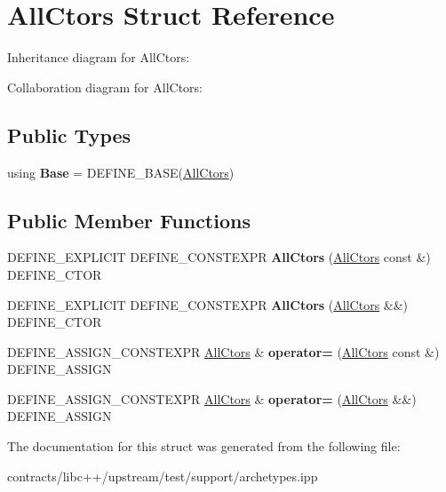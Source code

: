 \hypertarget{struct_all_ctors}{}\section{All\+Ctors Struct Reference}
\label{struct_all_ctors}


Inheritance diagram for All\+Ctors\+:


Collaboration diagram for All\+Ctors\+:
\subsection*{Public Types}
\begin{DoxyCompactItemize}
\item 
\mbox{\label{struct_all_ctors_a1f90e004351c076d9336a1df55b2a695}} 
using {\bfseries Base} = D\+E\+F\+I\+N\+E\+\_\+\+B\+A\+SE(\mbox{\hyperlink{struct_all_ctors}{All\+Ctors}})
\end{DoxyCompactItemize}
\subsection*{Public Member Functions}
\begin{DoxyCompactItemize}
\item 
\mbox{\label{struct_all_ctors_a0bb57fbc8ba8fcf689d6c3683961db70}} 
D\+E\+F\+I\+N\+E\+\_\+\+E\+X\+P\+L\+I\+C\+IT D\+E\+F\+I\+N\+E\+\_\+\+C\+O\+N\+S\+T\+E\+X\+PR {\bfseries All\+Ctors} (\mbox{\hyperlink{struct_all_ctors}{All\+Ctors}} const \&) D\+E\+F\+I\+N\+E\+\_\+\+C\+T\+OR
\item 
\mbox{\label{struct_all_ctors_a5c0d184f7fd6a13b7a297a274ff8992a}} 
D\+E\+F\+I\+N\+E\+\_\+\+E\+X\+P\+L\+I\+C\+IT D\+E\+F\+I\+N\+E\+\_\+\+C\+O\+N\+S\+T\+E\+X\+PR {\bfseries All\+Ctors} (\mbox{\hyperlink{struct_all_ctors}{All\+Ctors}} \&\&) D\+E\+F\+I\+N\+E\+\_\+\+C\+T\+OR
\item 
\mbox{\label{struct_all_ctors_adfeaa164a315d5b2420d9bfd593ce99e}} 
D\+E\+F\+I\+N\+E\+\_\+\+A\+S\+S\+I\+G\+N\+\_\+\+C\+O\+N\+S\+T\+E\+X\+PR \mbox{\hyperlink{struct_all_ctors}{All\+Ctors}} \& {\bfseries operator=} (\mbox{\hyperlink{struct_all_ctors}{All\+Ctors}} const \&) D\+E\+F\+I\+N\+E\+\_\+\+A\+S\+S\+I\+GN
\item 
\mbox{\label{struct_all_ctors_a1a5b6ea1c0a715f80a4e7d9bfc7e710c}} 
D\+E\+F\+I\+N\+E\+\_\+\+A\+S\+S\+I\+G\+N\+\_\+\+C\+O\+N\+S\+T\+E\+X\+PR \mbox{\hyperlink{struct_all_ctors}{All\+Ctors}} \& {\bfseries operator=} (\mbox{\hyperlink{struct_all_ctors}{All\+Ctors}} \&\&) D\+E\+F\+I\+N\+E\+\_\+\+A\+S\+S\+I\+GN
\end{DoxyCompactItemize}


The documentation for this struct was generated from the following file\+:\begin{DoxyCompactItemize}
\item 
contracts/libc++/upstream/test/support/archetypes.\+ipp\end{DoxyCompactItemize}
